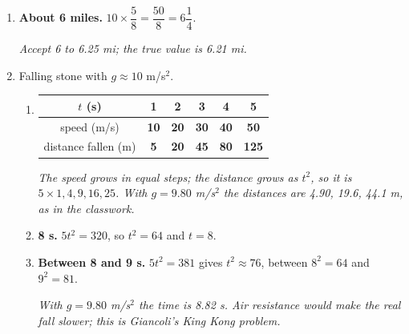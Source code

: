 \documentclass[12pt, twoside]{article}
\begin{document}
\begin{enumerate}[itemsep=0.3cm]
\item \textbf{About 6 miles.} \quad $10 \times \dfrac{5}{8} = \dfrac{50}{8}
  = 6\dfrac{1}{4}$.

  \emph{Accept 6 to 6.25 mi; the true value is 6.21 mi.}

\item Falling stone with $g \approx 10$ m/s$^2$.
  \begin{enumerate}[itemsep=0.1cm]
    \item \renewcommand{\arraystretch}{1.4}
      \begin{tabular}[t]{| c | c | c | c | c | c |}
        \hline
        $t$ (s) & 1 & 2 & 3 & 4 & 5 \\ \hline
        speed (m/s) & \textbf{10} & \textbf{20} & \textbf{30} & \textbf{40}
          & \textbf{50} \\ \hline
        distance fallen (m) & \textbf{5} & \textbf{20} & \textbf{45} & \textbf{80}
          & \textbf{125} \\ \hline
      \end{tabular}

      \emph{The speed grows in equal steps; the distance grows as $t^2$, so it is
      $5 \times 1, 4, 9, 16, 25$. With $g = 9.80$ m/s$^2$ the distances are 4.90,
      19.6, 44.1 m, as in the classwork.}
    \item \textbf{8 s.} \quad $5t^2 = 320$, so $t^2 = 64$ and $t = 8$.
    \item \textbf{Between 8 and 9 s.} \quad $5t^2 = 381$ gives $t^2 \approx 76$,
      between $8^2 = 64$ and $9^2 = 81$.

      \emph{With $g = 9.80$ m/s$^2$ the time is 8.82 s. Air resistance would make
      the real fall slower; this is Giancoli's King Kong problem.}
  \end{enumerate}

\end{enumerate}
\end{document}
